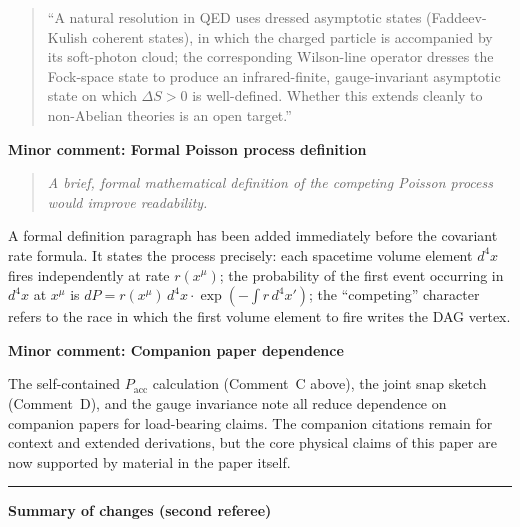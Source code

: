 \documentclass[11pt]{article}
\newcommand{\refereequote}[1]{%
  \begin{quote}\itshape\small #1\end{quote}}
\begin{document}
\begin{quote}
``A natural resolution in QED uses dressed asymptotic states
(Faddeev-Kulish coherent states), in which the charged particle is
accompanied by its soft-photon cloud; the corresponding Wilson-line
operator dresses the Fock-space state to produce an infrared-finite,
gauge-invariant asymptotic state on which $\Delta S > 0$ is well-defined.
Whether this extends cleanly to non-Abelian theories is an open target.''
\end{quote}

\noindent\textbf{Minor comment: Formal Poisson process definition}

\refereequote{A brief, formal mathematical definition of the competing
Poisson process would improve readability.}

A formal definition paragraph has been added immediately before the
covariant rate formula. It states the process precisely: each spacetime
volume element $d^4x$ fires independently at rate $r(x^\mu)$; the
probability of the first event occurring in $d^4x$ at $x^\mu$ is
$dP = r(x^\mu)\,d^4x \cdot \exp(-\int r\,d^4x')$; the ``competing''
character refers to the race in which the first volume element to fire
writes the DAG vertex.

\noindent\textbf{Minor comment: Companion paper dependence}

The self-contained $P_{\mathrm{acc}}$ calculation (Comment~C above),
the joint snap sketch (Comment~D), and the gauge invariance note all reduce
dependence on companion papers for load-bearing claims. The companion
citations remain for context and extended derivations, but the core
physical claims of this paper are now supported by material in the paper
itself.

\bigskip\hrule\bigskip

\noindent\textbf{Summary of changes (second referee)}
\end{document}
